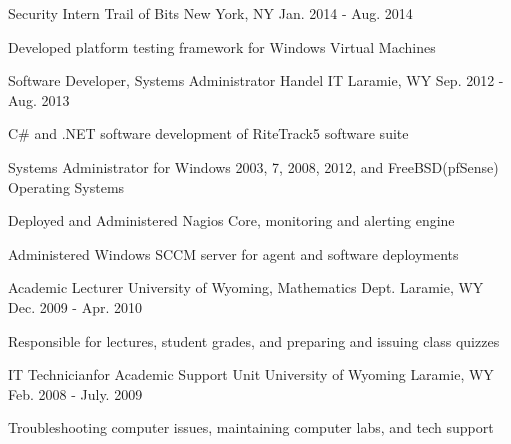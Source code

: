 \begin{cventries}

\cventry
{Security Intern} %
{Trail of Bits} %
{New York, NY} %
{Jan. 2014 - Aug. 2014} %
{ %
\begin{cvitems}
\item {Developed platform testing framework for Windows Virtual Machines}
\end{cvitems}
}


\cventry
{Software Developer, Systems Administrator} %
{Handel IT} %
{Laramie, WY} %
{Sep. 2012 - Aug. 2013} %
{ %
\begin{cvitems}
\item {C\# and .NET software development of RiteTrack5 software suite}
\item {Systems Administrator for Windows 2003, 7, 2008, 2012, and FreeBSD(pfSense) Operating Systems}
\item {Deployed and Administered Nagios Core, monitoring and alerting engine}
\item {Administered Windows SCCM server for agent and software deployments}
\end{cvitems} 
}


\begin{displaySection}
    \cventry
    {Academic Lecturer} %
    {University of Wyoming, Mathematics Dept.} %
    {Laramie, WY} %
    {Dec. 2009 - Apr. 2010} %
    { %
    \begin{cvitems}
    \item {Responsible for lectures, student grades, and preparing and issuing class quizzes}
    \end{cvitems}
    }


    \cventry
    {IT Technicianfor Academic Support Unit} %
    {University of Wyoming} %
    {Laramie, WY} %
    {Feb. 2008 - July. 2009} %
    { %
    \begin{cvitems}
    \item {Troubleshooting computer issues, maintaining computer labs, and tech support}
    \end{cvitems}
    }

\end{displaySection}

\end{cventries}